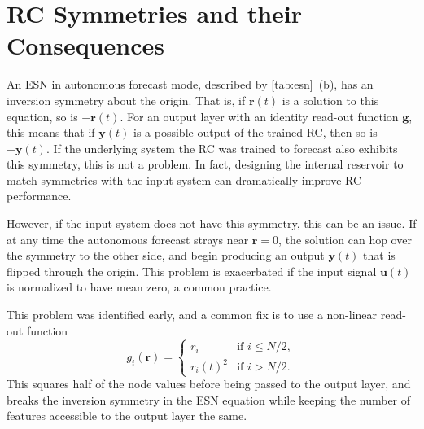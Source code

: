 \section{RC Symmetries and their Consequences}

An ESN in autonomous forecast mode, described by \cref{tab:esn}~(b),
has an inversion symmetry about the origin. That is, if $\bm{r}(t)$ is
a solution to this equation, so is $-\bm{r}(t)$. For an output layer
with an identity read-out function $\bm{g}$, this means that if
$\bm{y}(t)$ is a possible output of the trained RC, then so is
$-\bm{y}(t)$. If the underlying system the RC was trained to forecast
also exhibits this symmetry, this is not a problem. In fact, designing
the internal reservoir to match symmetries with the input system can
dramatically improve RC performance\cite{barbosa2021}.

However, if the input system does not have this symmetry, this can be
an issue. If at any time the autonomous forecast strays near $\bm{r} =
0$, the solution can hop over the symmetry to the other side, and
begin producing an output $\bm{y}(t)$ that is flipped through the
origin. This problem is exacerbated if the input signal $\bm{u}(t)$ is
normalized to have mean zero, a common practice.

This problem was identified early, and a common fix\cite{pathak2017,herteux2020}
is to use a non-linear read-out function
\begin{equation}
  g_i(\bm{r}) = \begin{cases}
    r_i & \text{if } i \leq N / 2, \\
    r_i(t)^2 & \text{if } i > N / 2.
  \end{cases}
  \label{eq:esn-break-sym}
\end{equation}
This squares half of the node values before being passed
to the output layer, and breaks the inversion symmetry in the ESN
equation while keeping the number of features accessible to the output
layer the same.

